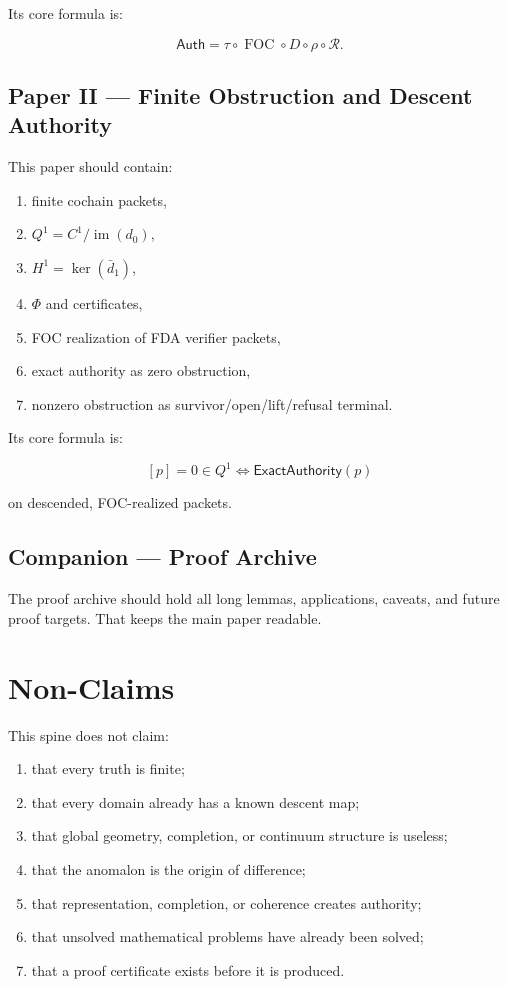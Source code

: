 \documentclass[11pt]{article}
\begin{document}
Its core formula is:

\[
\boxed{
\mathsf{Auth}
=
\tau\circ\operatorname{FOC}\circ D\circ\rho\circ\mathcal R.
}
\]

\subsection{Paper II — Finite Obstruction and Descent Authority}

This paper should contain:

\begin{enumerate}
    \item finite cochain packets,
    \item \(Q^1=C^1/\operatorname{im}(d_0)\),
    \item \(H^1=\ker(\bar d_1)\),
    \item \(\Phi\) and certificates,
    \item FOC realization of FDA verifier packets,
    \item exact authority as zero obstruction,
    \item nonzero obstruction as survivor/open/lift/refusal terminal.
\end{enumerate}

Its core formula is:

\[
\boxed{
[p]=0\in Q^1
\iff
\mathsf{ExactAuthority}(p)
}
\]

on descended, FOC-realized packets.

\subsection{Companion — Proof Archive}

The proof archive should hold all long lemmas, applications, caveats, and future proof targets. That keeps the main paper readable.

\section{Non-Claims}

This spine does not claim:

\begin{enumerate}
    \item that every truth is finite;
    \item that every domain already has a known descent map;
    \item that global geometry, completion, or continuum structure is useless;
    \item that the anomalon is the origin of difference;
    \item that representation, completion, or coherence creates authority;
    \item that unsolved mathematical problems have already been solved;
    \item that a proof certificate exists before it is produced.
\end{enumerate}
\end{document}

